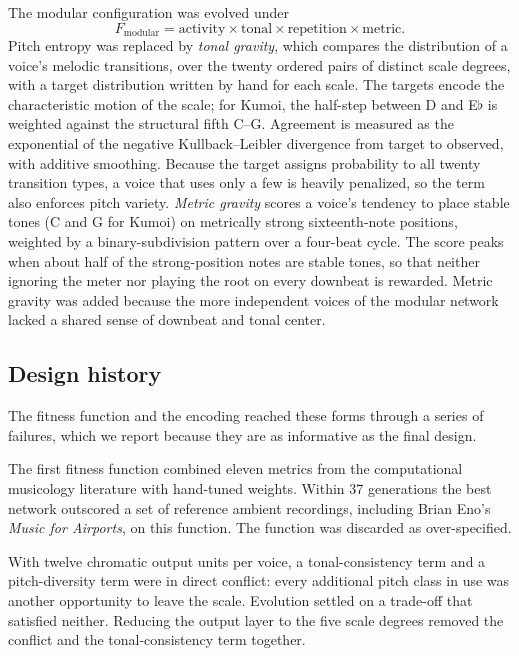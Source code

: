 \documentclass[conference]{IEEEtran}
\newcommand{\fl}{$\flat$}
\begin{document}
The modular configuration was evolved under
\begin{equation}
F_{\text{modular}} = \text{activity} \times \text{tonal} \times \text{repetition} \times \text{metric}.
\end{equation}
Pitch entropy was replaced by \emph{tonal gravity}, which compares the distribution of a voice's melodic transitions, over the twenty ordered pairs of distinct scale degrees, with a target distribution written by hand for each scale. The targets encode the characteristic motion of the scale; for Kumoi, the half-step between D and E\fl{} is weighted against the structural fifth C--G. Agreement is measured as the exponential of the negative Kullback--Leibler divergence from target to observed, with additive smoothing. Because the target assigns probability to all twenty transition types, a voice that uses only a few is heavily penalized, so the term also enforces pitch variety. \emph{Metric gravity} scores a voice's tendency to place stable tones (C and G for Kumoi) on metrically strong sixteenth-note positions, weighted by a binary-subdivision pattern over a four-beat cycle. The score peaks when about half of the strong-position notes are stable tones, so that neither ignoring the meter nor playing the root on every downbeat is rewarded. Metric gravity was added because the more independent voices of the modular network lacked a shared sense of downbeat and tonal center.

\subsection{Design history}

The fitness function and the encoding reached these forms through a series of failures, which we report because they are as informative as the final design.

The first fitness function combined eleven metrics from the computational musicology literature with hand-tuned weights. Within 37 generations the best network outscored a set of reference ambient recordings, including Brian Eno's \emph{Music for Airports}, on this function. The function was discarded as over-specified.

With twelve chromatic output units per voice, a tonal-consistency term and a pitch-diversity term were in direct conflict: every additional pitch class in use was another opportunity to leave the scale. Evolution settled on a trade-off that satisfied neither. Reducing the output layer to the five scale degrees removed the conflict and the tonal-consistency term together.
\end{document}
